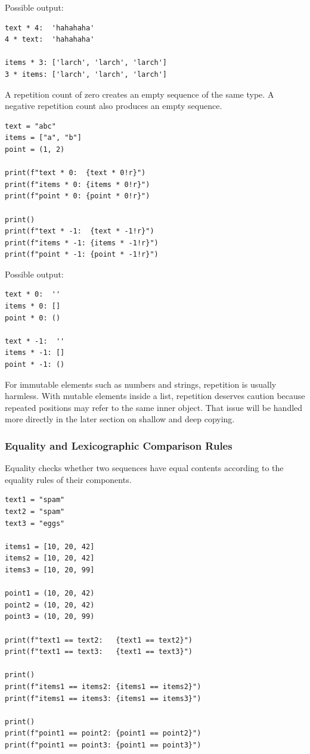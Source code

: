 Possible output:

\begin{verbatim}
text * 4:  'hahahaha'
4 * text:  'hahahaha'

items * 3: ['larch', 'larch', 'larch']
3 * items: ['larch', 'larch', 'larch']
\end{verbatim}

A repetition count of zero creates an empty sequence of the same type. A negative repetition count also produces an empty sequence.

\begin{verbatim}
text = "abc"
items = ["a", "b"]
point = (1, 2)

print(f"text * 0:  {text * 0!r}")
print(f"items * 0: {items * 0!r}")
print(f"point * 0: {point * 0!r}")

print()
print(f"text * -1:  {text * -1!r}")
print(f"items * -1: {items * -1!r}")
print(f"point * -1: {point * -1!r}")
\end{verbatim}

Possible output:

\begin{verbatim}
text * 0:  ''
items * 0: []
point * 0: ()

text * -1:  ''
items * -1: []
point * -1: ()
\end{verbatim}

For immutable elements such as numbers and strings, repetition is usually harmless. With mutable elements inside a list, repetition deserves caution because repeated positions may refer to the same inner object. That issue will be handled more directly in the later section on shallow and deep copying.

\subsubsection{Equality and Lexicographic Comparison Rules}

Equality checks whether two sequences have equal contents according to the equality rules of their components.

\begin{verbatim}
text1 = "spam"
text2 = "spam"
text3 = "eggs"

items1 = [10, 20, 42]
items2 = [10, 20, 42]
items3 = [10, 20, 99]

point1 = (10, 20, 42)
point2 = (10, 20, 42)
point3 = (10, 20, 99)

print(f"text1 == text2:   {text1 == text2}")
print(f"text1 == text3:   {text1 == text3}")

print()
print(f"items1 == items2: {items1 == items2}")
print(f"items1 == items3: {items1 == items3}")

print()
print(f"point1 == point2: {point1 == point2}")
print(f"point1 == point3: {point1 == point3}")
\end{verbatim}

